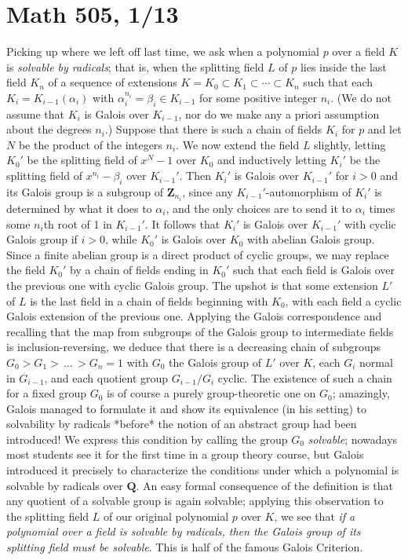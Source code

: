 \documentclass[10pt]{article}
\begin{document}
\section*{Math 505, 1/13}

Picking up where we left off last time, we ask when a polynomial $p$
over a field $K$ is {\sl solvable by radicals}; that is, when the
splitting field $L$ of $p$ lies inside the last field $K_n$ of a
sequence of extensions $K=K_0\subset K_1\subset\cdots\subset K_n$ such
that each $K_i = K_{i-1}(\alpha_i)$ with $\alpha_i^{n_i}=\beta_i\in
K_{i-1}$ for some positive integer $n_i$. (We do not assume that $K_i$
is Galois over $K_{i-1}$, nor do we make any a priori assumption about
the degrees $n_i$.) Suppose that there is such a chain of fields $K_i$
for $p$ and let $N$ be the product of the integers $n_i$. We now extend
the field $L$ slightly, letting $K_0'$ be the splitting field of $x^N -
1$ over $K_0$ and inductively letting $K_i'$ be the splitting field of
$x^{n_i} - \beta_i$ over $K_{i-1}'$. Then $K_i'$ is Galois over
$K_{i-1}'$ for $i>0$ and its Galois group is a subgroup of $\mathbf
Z_{n_i}$, since any $K_{i-1}'$-automorphism of $K_i'$ is determined by
what it does to $\alpha_i$, and the only choices are to send it to
$\alpha_i$ times some $n_i$th root of 1 in $K_{i-1}'$. It follows that
$K_i'$ is Galois over $K_{i-1}'$ with cyclic Galois group if $i>0$,
while $K_0'$ is Galois over $K_0$ with abelian Galois group. Since a
finite abelian group is a direct product of cyclic groups, we may
replace the field $K_0'$ by a chain of fields ending in $K_0'$ such that
each field is Galois over the previous one with cyclic Galois group. The
upshot is that some extension $L'$ of $L$ is the last field in a chain
of fields beginning with $K_0$, with each field a cyclic Galois
extension of the previous one. Applying the Galois correspondence and
recalling that the map from subgroups of the Galois group to
intermediate fields is inclusion-reversing, we deduce that there is a
decreasing chain of subgroups $G_0 > G_1 >\,\ldots\,> G_n = 1$ with
$G_0$ the Galois group of $L'$ over $K$, each $G_i$ normal in $G_{i-1}$,
and each quotient group $G_{i-1}/G_i$ cyclic. The existence of such a
chain for a fixed group $G_0$ is of course a purely group-theoretic one
on $G_0$; amazingly, Galois managed to formulate it and show its
equivalence (in his setting) to solvability by radicals *before* the
notion of an abstract group had been introduced! We express this
condition by calling the group $G_0$ {\sl solvable}; nowadays most
students see it for the first time in a group theory course, but Galois
introduced it precisely to characterize the conditions under which a
polynomial is solvable by radicals over $\mathbf Q$. An easy formal
consequence of the definition is that any quotient of a solvable group
is again solvable; applying this observation to the splitting field $L$
of our original polynomial $p$ over $K$, we see that {\sl if a
  polynomial over a field is solvable by radicals, then the Galois group
  of its splitting field must be solvable}. This is half of the famous
Galois Criterion.
\end{document}
